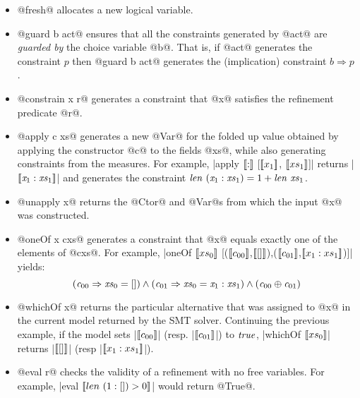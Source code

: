 \begin{itemize}

\item{@fresh@} allocates a new logical variable.

\item{@guard b act@} ensures that all the constraints 
generated by @act@ are \emph{guarded by} the choice 
variable @b@. That is, if @act@ generates the constraint 
$p$ then @guard b act@ generates the (implication) 
constraint ${b \Rightarrow p}$.

\item{@constrain x r@} generates a constraint that @x@ 
satisfies the refinement predicate @r@.

\item{@apply c xs@} generates a new @Var@ for the folded up value 
obtained by applying the constructor @c@ to the fields @xs@,
while also generating constraints from the measures. For example, 
{|apply $[\![:]\!]$ [$[\![x_1]\!]$, $[\![xs_1]\!]$]|} returns |$[\![\mathrm{{\mathit{{x}}_1}:{\mathit{{xs}}_1}}]\!]$|
and generates the constraint
${\mathit{{len}}\ {(\mathrm{{\mathit{{x}}_1}:{\mathit{{xs}}_1}})} = 1 + \mathit{{len}}\ {\mathit{{xs}}_1}}$.

\item{@unapply x@} returns the @Ctor@ and @Var@s from which the input 
@x@ was constructed. 

\item{@oneOf x cxs@} generates a constraint that @x@ equals exactly
one of the elements of @cxs@. For example, 
{|oneOf $[\![xs_0]\!]$ [($[\![c_{00}]\!]$,$[\![[]]\!]$),($[\![c_{01}]\!]$,$[\![x_1 : xs_1]\!]$)]|} 
yields:
$$(\mathit{{c}}_{00} \Rightarrow \mathit{{xs}}_0 = \mathrm{[]}) \wedge 
  (\mathit{{c}}_{01} \Rightarrow \mathit{{xs}}_0 = \mathrm{{\mathit{{x}}_1}:{\mathit{{xs}}_1}}) \wedge 
  (\mathit{{c}}_{00} \oplus \mathit{{c}}_{01})$$

\item{@whichOf x@} returns the particular alternative that was 
assigned to @x@ in the current model returned by the 
SMT solver. Continuing the previous example, if the model sets 
|$[\![c_{00}]\!]$| (resp. |$[\![c_{01}]\!]$|) to $\mathit{{true}}$, |whichOf $[\![xs_0]\!]$| returns 
|$[\![[]]\!]$| (resp \hbox{|$[\![x_1 : xs_1]\!]$|).}

\item{@eval r@} checks the validity of a refinement with no free variables. For
  example, |eval $\meta{len\ (1 : []) > 0}$| would return @True@.

\end{itemize}


